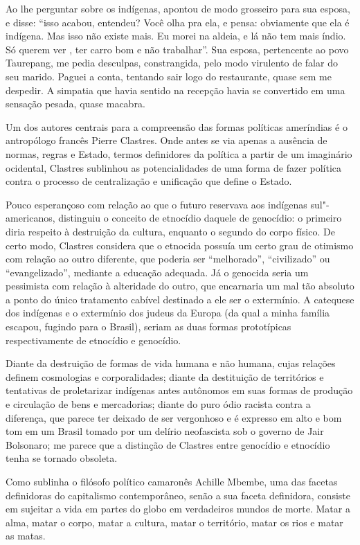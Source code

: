 Ao lhe perguntar sobre os indígenas, apontou de modo grosseiro para sua
esposa, e disse: ``isso acabou, entendeu? Você olha pra ela, e pensa:
obviamente que ela é indígena. Mas isso não existe mais. Eu morei na
aldeia, e lá não tem mais índio. Só querem ver , ter carro bom e não
trabalhar''. Sua esposa, pertencente ao povo Taurepang, me pedia
desculpas, constrangida, pelo modo virulento de falar do seu marido.
Paguei a conta, tentando sair logo do restaurante, quase sem me
despedir. A simpatia que havia sentido na recepção havia se convertido
em uma sensação pesada, quase macabra.

\asterisc

Um dos autores centrais para a compreensão das formas políticas
ameríndias é o antropólogo francês Pierre Clastres.
Onde antes se via apenas a ausência de normas, regras
e Estado, termos definidores da política a partir de um imaginário
ocidental, Clastres sublinhou as potencialidades de uma forma de fazer
política contra o processo de centralização e unificação que define o
Estado.

Pouco esperançoso com relação ao que o futuro reservava aos indígenas sul"-americanos, distinguiu o conceito de etnocídio daquele de genocídio: o
primeiro diria respeito à destruição da cultura, enquanto o segundo do
corpo físico. De certo modo, Clastres considera que o etnocida possuía
um certo grau de otimismo com relação ao outro diferente, que poderia
ser ``melhorado'', ``civilizado'' ou ``evangelizado'', mediante a
educação adequada. Já o genocida seria um pessimista com relação à
alteridade do outro, que encarnaria um mal tão absoluto a ponto do único
tratamento cabível destinado a ele ser o extermínio. A catequese dos
indígenas e o extermínio dos judeus da Europa (da qual a minha família
escapou, fugindo para o Brasil), seriam as duas formas prototípicas
respectivamente de etnocídio e genocídio.

Diante da destruição de formas de vida humana e não humana, cujas
relações definem cosmologias e corporalidades; diante da destituição de
territórios e tentativas de proletarizar indígenas antes autônomos em
suas formas de produção e circulação de bens e mercadorias; diante do
puro ódio racista contra a diferença, que parece ter deixado de ser
vergonhoso e é expresso em alto e bom tom em um Brasil tomado por um
delírio neofascista sob o governo de Jair Bolsonaro; me parece que a
distinção de Clastres entre genocídio e etnocídio tenha se tornado
obsoleta.

Como sublinha o filósofo político camaronês Achille Mbembe, uma das
facetas definidoras do capitalismo contemporâneo, senão a sua faceta
definidora, consiste em sujeitar a vida em partes do globo em
verdadeiros mundos de morte. Matar a alma, matar o corpo, matar a
cultura, matar o território, matar os rios e matar as matas.

